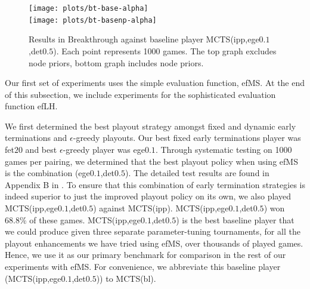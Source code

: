 \documentclass[conference]{IEEEtran}
\begin{document}
\begin{figure}[t]
\begin{center}
\texttt{[image: plots/bt-base-alpha]}\\
\texttt{[image: plots/bt-basenp-alpha]}
\caption{Results in Breakthrough against 
baseline player MCTS(ipp,ege$0.1$,det$0.5$).  
Each point represents 1000 games. The top graph excludes node priors, bottom graph includes node priors.} 
\label{fig:bt-base-alpha}
\end{center}
\end{figure}

Our first set of experiments uses the simple evaluation function, efMS. At the end of this subsection, we 
include experiments for the sophisticated evaluation function efLH.

We first determined the best playout strategy amongst fixed and dynamic early 
terminations and $\epsilon$-greedy playouts.
Our best fixed early terminations player was fet$20$ and best $\epsilon$-greedy player was ege$0.1$.
Through systematic testing on 1000 games per pairing, we determined that the best playout 
policy when using efMS is the combination (ege$0.1$,det$0.5$). 
The detailed test results are found in Appendix B in \cite{Lanctot14immcts-arxiv}.
To ensure that this combination of early termination strategies is indeed superior to just the improved 
playout policy on its own, we also played MCTS(ipp,ege$0.1$,det$0.5$) against MCTS(ipp). 
MCTS(ipp,ege$0.1$,det$0.5$) won 68.8\% of these games.
MCTS(ipp,ege$0.1$,det$0.5$) is the best baseline player that we could produce given three separate 
parameter-tuning tournaments, for all the playout enhancements we have tried using efMS, over 
thousands of played games. Hence, we use it as our primary benchmark for comparison in the 
rest of our experiments with efMS. 
For convenience, we abbreviate this baseline player (MCTS(ipp,ege$0.1$,det$0.5$)) to MCTS(bl). 

\end{document}
